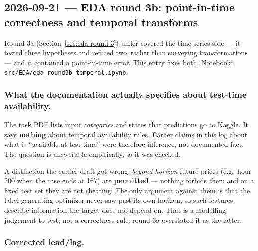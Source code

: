\subsection{2026-09-21 --- EDA round 3b: point-in-time correctness and temporal transforms}
\label{sec:eda-round-3b}

Round 3a (Section~\ref{sec:eda-round-3}) under-covered the time-series side --- it tested three
hypotheses and refuted two, rather than surveying transformations --- and it contained a
point-in-time error. This entry fixes both. Notebook:
\texttt{src/EDA/eda\_round3b\_temporal.ipynb}.

\subsubsection*{What the documentation actually specifies about test-time availability.}
The task PDF lists input \emph{categories} and states that predictions go to Kaggle. It says
\textbf{nothing} about temporal availability rules. Earlier claims in this log about what is
``available at test time'' were therefore inference, not documented fact. The question is
answerable empirically, so it was checked.


\medskip\noindent
A distinction the earlier draft got wrong: \emph{beyond-horizon} future prices (e.g.\ hour 200
when the case ends at 167) are \textbf{permitted} --- nothing forbids them and on a fixed test set
they are not cheating. The only argument against them is that the label-generating optimizer
never saw past its own horizon, so such features describe information the target does not depend
on. That is a modelling judgement to test, not a correctness rule; round 3a overstated it as the
latter.

\subsubsection*{Corrected lead/lag.}

